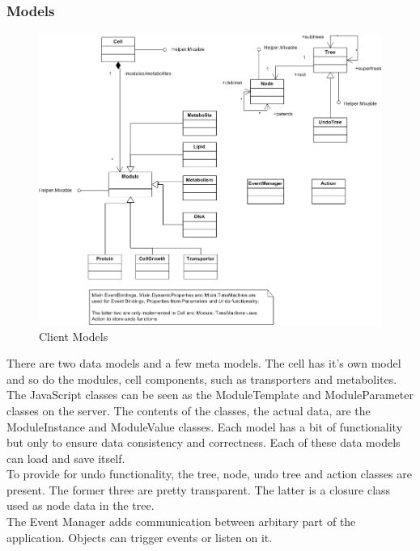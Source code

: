 \documentclass{report}
\begin{document}
				\subsubsection{Models}
					\begin{figure}[htb]
						\begin{center}
							\includegraphics[width=\linewidth]{models.png}
							\caption{Client Models}
							\label{fig: cmodels}
						\end{center}
					\end{figure}	
					There are two data models and a few meta models. The cell has it's own model and so do the modules, cell components, such as transporters and metabolites. The JavaScript classes can be seen as the ModuleTemplate and ModuleParameter classes on the server. The contents of the classes, the actual data, are the ModuleInstance and ModuleValue classes. Each model has a bit of functionality but only
					to ensure data consistency and correctness. Each of these data models can load and save itself. \\
					To provide for undo functionality, the tree, node, undo tree and action classes are present. The former three are pretty transparent. The latter is a closure class used as node data in the tree. \\
					The Event Manager adds communication between arbitary part of the application. Objects can trigger events or listen on it.
				
\end{document}
